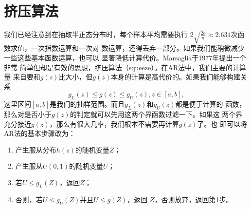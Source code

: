 \section{挤压算法}

我们已经注意到在抽取半正态分布时，每个样本平均需要执行
$2\sqrt{\frac{2e}{\pi}} \approx 2.631$次函数求值，一次指数运算和一次对
数运算，还得丢弃一部分。如果我们能稍微减少一些这些基本函数运算，也可以
显著降低计算代价。Marsaglia于1977年\cite{Marsaglia1977The}提出一个非常
简单但却是有效的思想，挤压算法（squeeze）。在AR法中，我们主要的计算量
来自要和$g(z)$比大小，但$g(z)$本身的计算是高代价的。如果我们能够构建关
系
\begin{equation}
  g_L(z) \leq g(z) \leq g_U(z), z \in [a, b],
\label{eq::squeeze}
\end{equation}
这里区间$[a, b]$是我们的抽样范围。而且$g_L(z)$和$g_U(z)$都是便于计算的
函数，那么对是否小于$g(z)$的判定就可以先用这两个界函数过滤一下。如果这
两个界充分接近$g(z)$，那么有很大几率，我们根本不需要再计算$g(z)$了。也
即可以将AR法的基本步骤改为：
\begin{enumerate}
\item 产生服从分布$h(z)$的随机变量$Z$；
\item 产生服从$U(0, 1)$的随机变量$U$；
\item 若$U \leq g_L(Z)$，返回$Z$；
\item 否则，若$U \leq g_U(Z)$并且$U \leq g(Z)$，返回
  $Z$，否则放弃，返回第1步。
\end{enumerate}

